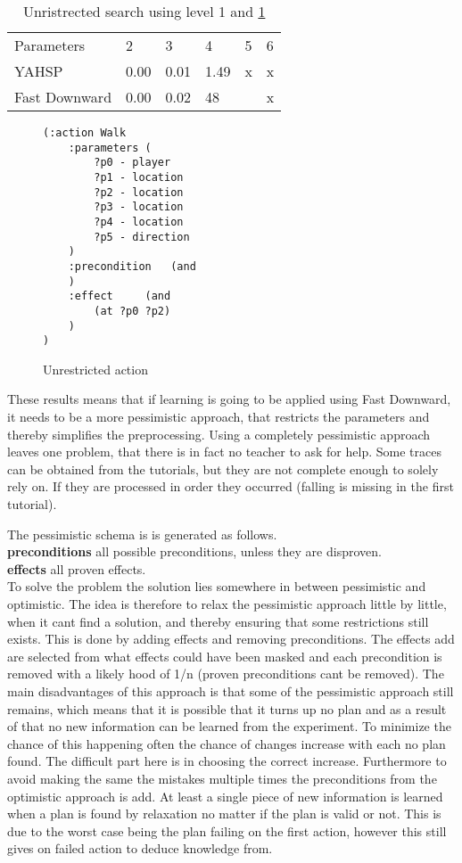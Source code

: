 \begin{table}
	\centering
	\caption{Unristrected search using level 1 and \ref{unrestricted}}
	\label{un-table}
	\begin{tabular}{llllll}
		Parameters & 2 & 3 & 4 & 5 & 6 \\
		YAHSP& 0.00 & 0.01  & 1.49 & x & x\\
		Fast Downward & 0.00 & 0.02 & 48 &  & x \\

	\end{tabular}
\end{table}
\begin{figure}
	\caption{Unrestricted action}
	\label{unrestricted}

\begin{lstlisting}
(:action Walk
	:parameters (
		?p0 - player
		?p1 - location
		?p2 - location
		?p3 - location
		?p4 - location
		?p5 - direction
	)
	:precondition 	(and
	)
	:effect 	(and
		(at ?p0 ?p2)
	)
)
\end{lstlisting}
\end{figure}


These results means that if learning is going to be applied using Fast Downward, it needs to be a more pessimistic approach, that restricts the parameters and thereby simplifies the preprocessing. Using a completely pessimistic approach leaves one problem, that there is in fact no teacher to ask for help. Some traces can be obtained from the tutorials, but they are not complete enough to solely rely on. If they are processed in order they occurred (falling is missing in the first tutorial).  

The pessimistic schema is is generated as follows.\\
\textbf{preconditions}
all possible preconditions, unless they are disproven.\\
\textbf{effects}
all proven effects.\\

To solve the problem the solution lies somewhere in between pessimistic and optimistic. The idea is therefore to relax the pessimistic approach little by little, when it cant find a solution, and thereby ensuring that some restrictions still exists. This is done by adding effects and removing preconditions. The effects add are selected from what effects could have been masked and each precondition is removed with a likely hood of 1/n (proven preconditions cant be removed). The main disadvantages of this approach is that some of the pessimistic approach still remains, which means that it is possible that it turns up no plan and as a result of that no new information can be learned from the experiment. To minimize the chance of this happening often the chance of changes increase with each no plan found. The difficult part here is in choosing the correct increase. Furthermore to avoid making the same the mistakes multiple times the preconditions from the optimistic approach is add. At least a single piece of new information is learned when a plan is found by relaxation no matter if the plan is valid or not. This is due to the worst case being the plan failing on the first action, however this still gives on failed action to deduce knowledge from. 

